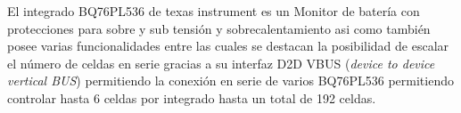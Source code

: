 \documentclass[10pt,a4paper]{article}
\begin{document}
	
	El integrado BQ76PL536 de texas instrument es un Monitor de batería con protecciones para sobre  y sub tensión y sobrecalentamiento asi como también posee varias funcionalidades entre las cuales se destacan la posibilidad de escalar el número de celdas en serie gracias a su interfaz D2D VBUS  (\emph{device to device vertical BUS}) permitiendo la conexión en serie de varios BQ76PL536 permitiendo controlar hasta 6 celdas por integrado hasta un total de 192 celdas.
\end{document}
